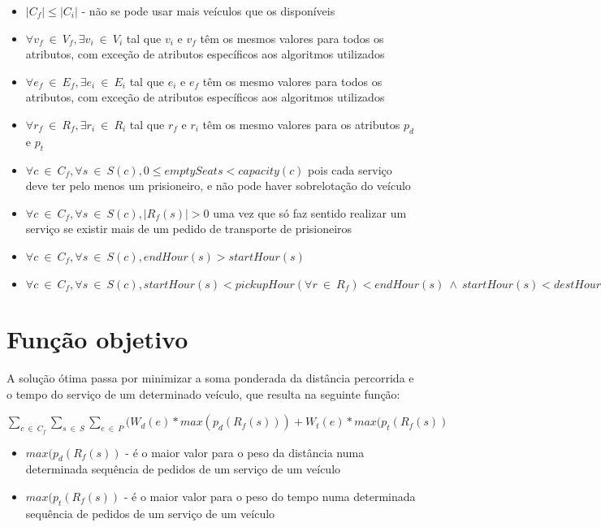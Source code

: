 \documentclass[article, a4paper, 12pt, oneside]{memoir}
\begin{document}
\begin{itemize}
	\item $\vert C_f \vert \leq \vert C_i \vert $ - não se pode usar mais veículos que os disponíveis
	\item $\forall v_f ~ \in ~ V_f, \exists v_i ~ \in ~ V_i$ tal que $v_i$ e $v_f$ têm os mesmos valores para todos os atributos, com exceção de atributos específicos aos algoritmos utilizados
	\item $\forall e_f ~ \in ~ E_f, \exists e_i ~ \in ~ E_i$ tal que $e_i$ e $e_f$ têm os mesmo valores para todos os atributos, com exceção de atributos específicos aos algoritmos utilizados
	\item $\forall r_f ~ \in ~ R_f, \exists r_i ~ \in ~ R_i$ tal que $r_f$ e $r_i$ têm os mesmo valores para os atributos $p_d$ e $p_t$
	\item $\forall c ~ \in ~ C_f, \forall s ~ \in ~ S(c), 0 \leq emptySeats < capacity(c)$ pois cada serviço deve ter pelo menos um prisioneiro, e não pode haver sobrelotação do veículo
	\item $\forall c ~ \in ~ C_f, \forall s ~ \in ~ S(c), \vert R_f(s) \vert > 0$ uma vez que só faz sentido realizar um serviço se existir mais de um pedido de transporte de prisioneiros
	\item $\forall c ~ \in ~ C_f, \forall s ~ \in ~ S(c), endHour(s) > startHour(s)$
	\item $\forall c ~ \in ~ C_f, \forall s ~ \in ~ S(c), startHour(s) < pickupHour(\forall r ~ \in ~ R_f) < endHour(s) ~ \wedge ~ startHour(s) < destHour(\forall r ~ \in ~ R_f) \leq endHour(s)$
\end{itemize}

\section{Função objetivo}

A solução ótima passa por minimizar a soma ponderada da distância percorrida e o tempo do serviço de um determinado veículo, que resulta na seguinte função:

$\sum_{c ~ \in ~ C_f} \sum_{s ~ \in ~ S} \sum_{e ~ \in ~ P} (W_d(e) * max(p_d(R_f(s))) + W_t(e) * max(p_t(R_f(s))$

\begin{itemize}
	\item $max(p_d(R_f(s))$ - é o maior valor para o peso da distância numa determinada sequência de pedidos de um serviço de um veículo 
	\item $max(p_t(R_f(s))$ - é o maior valor para o peso do tempo numa determinada sequência de pedidos de um serviço de um veículo
\end{itemize}
\end{document}
